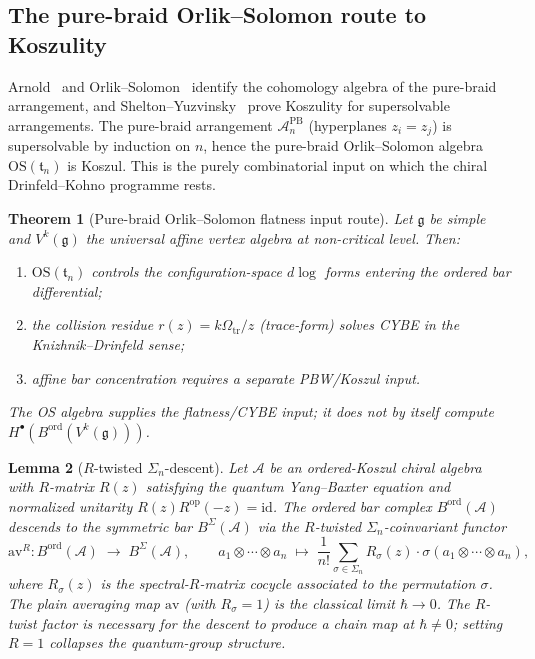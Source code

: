 \documentclass[11pt,reqno]{amsart}
\newtheorem{theorem}{Theorem}[section]
\newtheorem{lemma}[theorem]{Lemma}
\theoremstyle{definition}
\theoremstyle{remark}
\newcommand{\cA}{\mathcal{A}}
\newcommand{\fg}{\mathfrak{g}}
\newcommand{\id}{\mathrm{id}}
\numberwithin{equation}{section}
\begin{document}
\subsection{The pure-braid Orlik--Solomon route to Koszulity}
\label{sec:dk-os-route}

Arnold~\cite{Arnold69} and Orlik--Solomon~\cite{OS80} identify the
cohomology algebra of the pure-braid arrangement, and
Shelton--Yuzvinsky~\cite{SheltonYuzvinsky97} prove Koszulity for
supersolvable arrangements. The pure-braid arrangement
$\mathcal{A}_n^{\mathrm{PB}}$ (hyperplanes $z_i = z_j$) is
supersolvable by induction on $n$, hence the pure-braid
Orlik--Solomon algebra $\mathrm{OS}(\mathfrak{t}_n)$ is Koszul. This
is the purely combinatorial input on which the chiral
Drinfeld--Kohno programme rests.

\begin{theorem}[Pure-braid Orlik--Solomon flatness input
route]\label{thm:dk-os-koszul}
Let $\fg$ be simple and $V^k(\fg)$ the universal affine vertex
algebra at non-critical level. Then:
\begin{enumerate}[label=\textup{(\roman*)}]
 \item $\mathrm{OS}(\mathfrak{t}_n)$ controls the configuration-space
 $d\log$ forms entering the ordered bar differential;
 \item the collision residue $r(z) = k\Omega_{\mathrm{tr}}/z$
 (trace-form) solves CYBE in the Knizhnik--Drinfeld sense;
 \item affine bar concentration requires a separate PBW/Koszul input.
\end{enumerate}
The OS algebra supplies the flatness/CYBE input; it does not by itself
compute \(H^\bullet(B^{\mathrm{ord}}(V^k(\fg)))\).
\end{theorem}

\begin{lemma}[$R$-twisted $\Sigma_n$-descent]\label{lem:dk-r-twist-descent}
Let $\cA$ be an ordered-Koszul chiral algebra with $R$-matrix
$R(z)$ satisfying the quantum Yang--Baxter equation and normalized
unitarity $R(z)R^{\mathrm{op}}(-z)=\id$. The ordered bar complex
$B^{\mathrm{ord}}(\cA)$ descends to
the symmetric bar $B^\Sigma(\cA)$ via the $R$-twisted
$\Sigma_n$-coinvariant functor
\[
 \mathrm{av}^R \colon B^{\mathrm{ord}}(\cA) \;\longrightarrow\;
 B^\Sigma(\cA), \qquad
 a_1 \otimes \cdots \otimes a_n \;\mapsto\;
 \frac{1}{n!}\sum_{\sigma \in \Sigma_n} R_\sigma(z) \cdot
 \sigma(a_1 \otimes \cdots \otimes a_n),
\]
where $R_\sigma(z)$ is the spectral-$R$-matrix cocycle associated to
the permutation $\sigma$. The plain averaging map $\mathrm{av}$
(with $R_\sigma = 1$) is the classical limit $\hbar \to 0$. The
$R$-twist factor is necessary for the descent to produce a chain map
at $\hbar \neq 0$; setting $R = 1$ collapses the quantum-group
structure.
\end{lemma}
\end{document}
